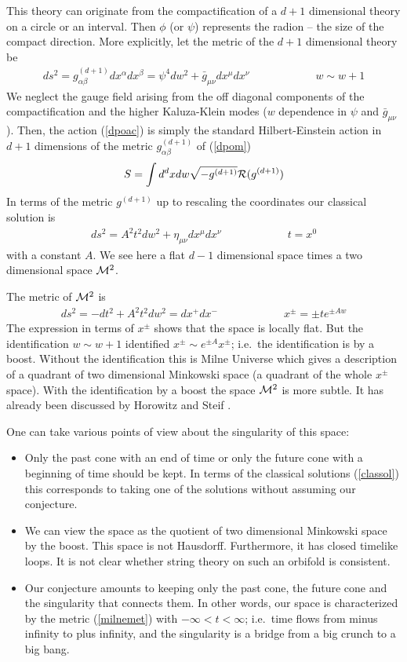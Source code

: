 \documentclass[a4paper,12pt,oneside]{article}
\begin{document}
This theory can originate from the compactification of a $d+1$
dimensional theory on a circle or an interval.  Then $\phi$ (or
$\psi$) represents the radion -- the size of the compact
direction.  More explicitly, let the metric of the $d+1$
dimensional theory be
\begin{eqnarray}
ds^2=g^{(d+1)}_{\alpha\beta}dx^\alpha dx^\beta =\psi^4 dw^2 + \bar
g _{\mu\nu} dx^\mu dx^\nu \qquad\qquad\qquad w\sim w+1
\label{dpom}
\end{eqnarray}
We neglect the gauge field arising from the off diagonal
components of the compactification and the higher Kaluza-Klein
modes ($w$ dependence in $\psi$ and $\bar g_{\mu\nu}$).  Then,
the action (\ref{dpoac}) is simply the standard Hilbert-Einstein
action in $d+1$ dimensions of the metric
$g^{(d+1)}_{\alpha\beta}$ of (\ref{dpom})
\begin{eqnarray}
S=\int d^dxdw \sqrt{- g^{(d+1)}} {\cal R}( g^{(d+1)})
\label{dpoaca}
\end{eqnarray}
In terms of the metric $g^{(d+1)}$ up to rescaling the
coordinates our classical solution is
\begin{eqnarray}
ds^2=A^2t^2 dw^2 + \eta _{\mu\nu} dx^\mu dx^\nu
\qquad\qquad\qquad t=x^0
\end{eqnarray}
with a constant $A$.  We see here a flat $d-1$ dimensional space
times a two dimensional space ${\cal M}^2$.

The metric of ${\cal M}^2$ is
\begin{eqnarray}
ds^2=-dt^2 + A^2t^2 dw^2 = dx^+dx^- \qquad\qquad\qquad x^\pm=\pm
t e^{\pm Aw} \label{milnemet}
\end{eqnarray}
The expression in terms of $x^\pm$ shows that the space is
locally flat.  But the identification $w\sim w+1$ identified
$x^\pm \sim e^{\pm A} x^\pm $; i.e.\ the identification is by a
boost.  Without the identification this is Milne Universe which
gives a description of a quadrant of two dimensional Minkowski
space (a quadrant of the whole $x^\pm$ space).  With the
identification by a boost the space ${\cal M}^2$ is more subtle.
It has already been discussed by Horowitz and Steif \cite{HS}.

One can take various points of view about the singularity of this
space:
\begin{itemize}
  \item
Only the past cone with an end of time or only the future cone
with a beginning of time should be kept.  In terms of the
classical solutions (\ref{classol}) this corresponds to taking
one of the solutions without assuming our conjecture.
 \item
We can view the space as the quotient of two dimensional Minkowski
space by the boost. This space is not Hausdorff.  Furthermore, it
has closed timelike loops.  It is not clear whether string theory
on such an orbifold is consistent.
 \item
Our conjecture amounts to keeping only the past cone, the future
cone and the singularity that connects them.  In other words, our
space is characterized by the metric (\ref{milnemet}) with
$-\infty <t < \infty$; i.e.\ time flows from minus infinity to
plus infinity, and the singularity is a bridge from a big crunch
to a big bang.
\end{itemize}
\end{document}
